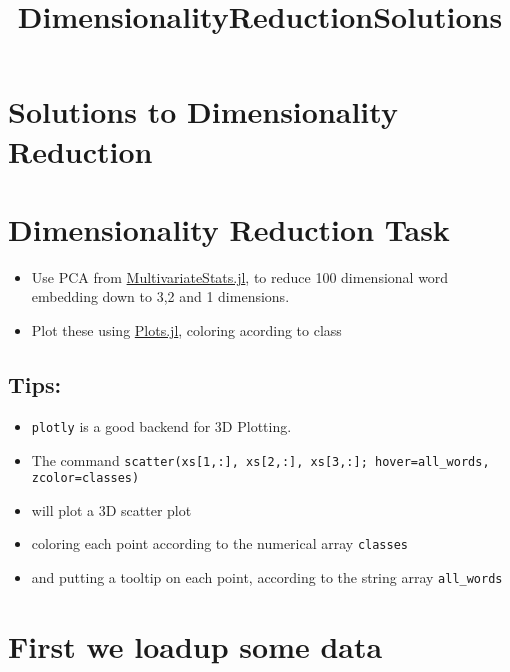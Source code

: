 \documentclass[11pt]{article}
\title{DimensionalityReductionSolutions}
\begin{document}
    
    
    \maketitle
    
    

    
    \section{Solutions to Dimensionality
Reduction}\label{solutions-to-dimensionality-reduction}

\section{Dimensionality Reduction
Task}\label{dimensionality-reduction-task}

\begin{itemize}
\itemsep1pt\parskip0pt
\item
  Use PCA from
  \href{https://github.com/JuliaStats/MultivariateStats.jl}{MultivariateStats.jl},
  to reduce 100 dimensional word embedding down to 3,2 and 1 dimensions.
\item
  Plot these using
  \href{https://github.com/tbreloff/Plots.jl}{Plots.jl}, coloring
  acording to class
\end{itemize}

\subsection{Tips:}\label{tips}

\begin{itemize}
\itemsep1pt\parskip0pt
\item
  \texttt{plotly} is a good backend for 3D Plotting.
\item
  The command
  \texttt{scatter(xs{[}1,:{]}, xs{[}2,:{]}, xs{[}3,:{]}; hover=all\_words, zcolor=classes)}
\item
  will plot a 3D scatter plot
\item
  coloring each point according to the numerical array \texttt{classes}
\item
  and putting a tooltip on each point, according to the string array
  \texttt{all\_words}
\end{itemize}

    \section{First we loadup some data}\label{first-we-loadup-some-data}
\end{document}
